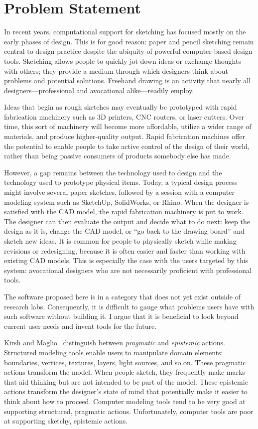 \documentclass[11pt]{article}
\begin{document}
\section{Problem Statement}

In recent years, computational support for sketching has focused
mostly on the early phases of design. This is for good reason: paper
and pencil sketching remain central to design practice despite the
ubiquity of powerful computer-based design tools. Sketching allows
people to quickly jot down ideas or exchange thoughts with others;
they provide a medium through which designers think about problems and
potential solutions. Freehand drawing is an activity that nearly all
designers---professional and avocational alike---readily employ.

Ideas that begin as rough sketches may eventually be prototyped with
rapid fabrication machinery such as 3D printers, CNC routers, or laser
cutters. Over time, this sort of machinery will become more
affordable, utilize a wider range of materials, and produce
higher-quality output. Rapid fabrication machines offer the potential
to enable people to take active control of the design of their world,
rather than being passive consumers of products somebody else has
made.

However, a gap remains between the technology used to design and the
technology used to prototype physical items. Today, a typical design
process might involve several paper sketches, followed by a session
with a computer modeling system such as SketchUp, SolidWorks, or
Rhino. When the designer is satisfied with the CAD model, the rapid
fabrication machinery is put to work. The designer can then evaluate
the output and decide what to do next: keep the design as it is,
change the CAD model, or ``go back to the drawing board'' and sketch
new ideas. It is common for people to physically sketch while making
revisions or redesigning, because it is often easier and faster than
working with existing CAD models. This is especially the case with the
users targeted by this system: avocational designers who are not
necessarily proficient with professional tools.

The software proposed here is in a category that does not yet exist
outside of research labs. Consequently, it is difficult to gauge what
problems users have with such software without building it. I argue
that it is beneficial to look beyond current user needs and invent
tools for the future.

Kirsh and Maglio~\cite{kirch-epistemic-action} distinguish between
\textit{pragmatic} and \textit{epistemic} actions. Structured modeling
tools enable users to manipulate domain elements: boundaries,
vertices, textures, layers, light sources, and so on. These pragmatic
actions transform the model. When people sketch, they frequently make
marks that aid thinking but are not intended to be part of the
model. These epistemic actions transform the designer's state of mind
that potentially make it easier to think about how to
proceed. Computer modeling tools tend to be very good at supporting
structured, pragmatic actions. Unfortunately, computer tools are poor
at supporting sketchy, epistemic actions.
\end{document}
